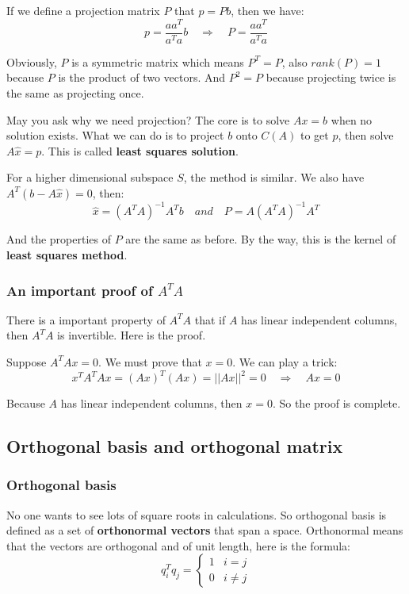 \documentclass[12pt]{ctexart}
\begin{document}
If we define a projection matrix $P$ that $p = Pb$, then we have:
\[
  p = \frac{a a^{T}}{a^{T}a} b \quad \Rightarrow \quad P = \frac{a a^{T}}{a^{T}a}
\]

Obviously, $P$ is a symmetric matrix which means $P^{T} = P$, also $rank(P) = 1$ because
$P$ is the product of two vectors. And $P^{2} = P$ because projecting twice is the same as
projecting once.

May you ask why we need projection? The core is to solve $Ax = b$ when no solution exists.
What we can do is to project $b$ onto $C(A)$ to get $p$, then solve $A \hat{x} = p$. This
is called \textbf{least squares solution}.

For a higher dimensional subspace $S$, the method is similar. We also have $A^{T}(b -
A\hat{x}) = 0$, then:
\[
  \hat{x} = (A^{T}A)^{-1}A^{T}b \quad and \quad P = A(A^{T}A)^{-1}A^{T}
\]

And the properties of $P$ are the same as before. By the way, this is the kernel of
\textbf{least squares method}.

\subsubsection{\textbf{An important proof of $A^{T}A$}}

There is a important property of $A^{T}A$ that if $A$ has linear independent columns,
then $A^{T}A$ is invertible. Here is the proof.

Suppose $A^{T}Ax = 0$. We must prove that $x = 0$. We can play a trick:
\[
  x^{T}A^{T}Ax = (Ax)^{T}(Ax) = ||Ax||^{2} = 0 \quad \Rightarrow \quad Ax = 0
\]

Because $A$ has linear independent columns, then $x = 0$. So the proof is complete.

\subsection{\textbf{Orthogonal basis and orthogonal matrix}}
\subsubsection{\textbf{Orthogonal basis}}

No one wants to see lots of square roots in calculations. So orthogonal basis is defined
as a set of \textbf{orthonormal vectors} that span a space. Orthonormal means that the
vectors are orthogonal and of unit length, here is the formula:
\[
  q_i^{T}q_j = \begin{cases}
    1 & i = j \\
    0 & i \neq j
  \end{cases}
\]
\end{document}
